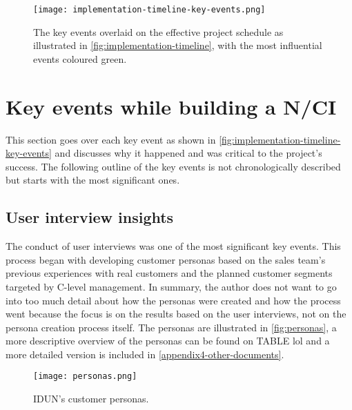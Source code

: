 \begin{figure}[!ht]
  \centering
  \texttt{[image: implementation-timeline-key-events.png]}
  \caption{The key events overlaid on the effective project schedule as illustrated in \autoref{fig:implementation-timeline}, with the most influential events coloured green.}
  \label{fig:implementation-timeline-key-events}
\end{figure}


\section{Key events while building a N/CI}
\label{chapter4-key-events}

This section goes over each key event as shown in \autoref{fig:implementation-timeline-key-events} and discusses why it happened and was critical to the project's success. The following outline of the key events is not chronologically described but starts with the most significant ones.

\subsection{User interview insights}
\label{chapter4-user-interview-insights}

The conduct of user interviews was one of the most significant key events. This process began with developing customer personas based on the sales team's previous experiences with real customers and the planned customer segments targeted by C-level management. In summary, the author does not want to go into too much detail about how the personas were created and how the process went because the focus is on the results based on the user interviews, not on the persona creation process itself. The personas are illustrated in \autoref{fig:personas}, a more descriptive overview of the personas can be found on TABLE lol and a more detailed version is included in \autoref{appendix4-other-documents}.

\begin{figure}[!ht]
  \centering
  \texttt{[image: personas.png]}
  \caption{IDUN's customer personas.}
  \label{fig:personas}
\end{figure}

